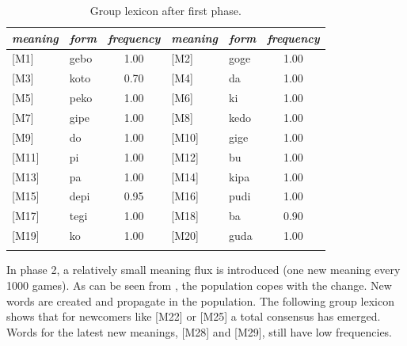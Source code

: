 \begin{table}
\begin{center}
\begin{tabular}{l  l  c  l  l  c } \lsptoprule 
{\itshape meaning} & {\itshape form} & {\itshape frequency} & {\itshape meaning} & {\itshape form} & {\itshape frequency}\\ \midrule 
{}[M1]& gebo & 1.00 & [M2]& goge & 1.00 \\  
{}[M3]& koto & 0.70 & [M4]& da & 1.00 \\  
{}[M5]& peko & 1.00 & [M6]& ki & 1.00 \\  
{}[M7]& gipe & 1.00 & [M8]& kedo & 1.00 \\  
{}[M9]& do & 1.00 & [M10]& gige & 1.00 \\  
{}[M11]& pi & 1.00 & [M12]& bu & 1.00 \\  
{}[M13]& pa & 1.00 & [M14]& kipa & 1.00 \\  
{}[M15]& depi & 0.95 & [M16]& pudi & 1.00 \\  
{}[M17]& tegi & 1.00 & [M18]& ba & 0.90 \\  
{}[M19]& ko & 1.00 & [M20]& guda & 1.00 \\  
 \lspbottomrule
\end{tabular}
\caption{\label{tab:gphase1}Group lexicon after first phase.}
\end{center}
\end{table}
In phase 2, a relatively small meaning flux is introduced (one
new meaning every 1000 games). As can 
be seen from , 
the population copes with the change. New words are created and 
propagate in the population. The following group lexicon
shows that for newcomers like [M22] or [M25] a total 
consensus has emerged. Words for the latest
new meanings, [M28] and [M29], still have low frequencies. 

